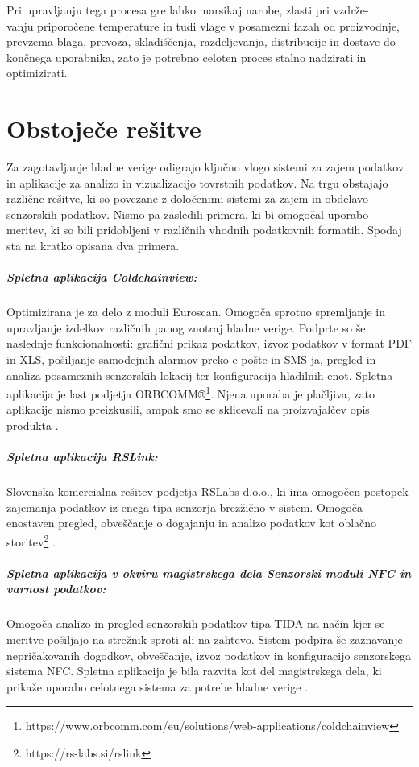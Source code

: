 \documentclass[a4paper, 12pt]{book}
\begin{document}
Pri upravljanju tega procesa gre lahko marsikaj narobe, zlasti pri
vzdrže-\\vanju priporočene temperature in tudi vlage v posamezni fazah od proizvodnje, prevzema blaga, prevoza, skladiščenja, razdeljevanja, distribucije in dostave do končnega uporabnika, zato je potrebno celoten proces stalno nadzirati in optimizirati.


\section{Obstoječe rešitve}

Za zagotavljanje hladne verige odigrajo ključno vlogo sistemi za zajem podatkov in aplikacije za analizo in vizualizacijo tovrstnih podatkov. 
Na trgu obstajajo različne rešitve, ki so povezane z določenimi sistemi za zajem in obdelavo senzorskih podatkov. Nismo pa zasledili primera, ki bi omogočal uporabo meritev, ki so bili pridobljeni v različnih vhodnih podatkovnih formatih. 
Spodaj sta na kratko opisana dva primera.


\subparagraph{\textbf{Spletna aplikacija Coldchainview:}} 
Optimizirana je za delo z moduli Euroscan. Omogoča sprotno spremljanje in upravljanje izdelkov različnih panog znotraj hladne verige. Podprte so še naslednje funkcionalnosti: grafični prikaz podatkov, izvoz podatkov v format PDF in XLS, pošiljanje samodejnih alarmov preko e-pošte in SMS-ja, pregled in analiza posameznih senzorskih lokacij ter konfiguracija hladilnih enot.
Spletna aplikacija je last podjetja ORBCOMM®\footnote
{https://www.orbcomm.com/eu/solutions/web-applications/coldchainview}. Njena uporaba je plačljiva, zato aplikacije nismo preizkusili, ampak smo se sklicevali na proizvajalčev opis produkta \cite{coldchainview}.

\subparagraph{\textbf{Spletna aplikacija RSLink:}}  
Slovenska komercialna rešitev podjetja RSLabs d.o.o., ki ima omogočen postopek zajemanja podatkov iz enega tipa senzorja brezžično v sistem. Omogoča enostaven pregled, obveščanje o dogajanju in analizo podatkov kot oblačno storitev\footnote{https://rs-labs.si/rslink} \cite{rslink}.

\subparagraph{\textbf{Spletna aplikacija v okviru magistrskega dela Senzorski moduli NFC in varnost podatkov:}}  
Omogoča analizo in pregled senzorskih podatkov tipa TIDA na način kjer se meritve pošiljajo na strežnik sproti ali na zahtevo. Sistem podpira še zaznavanje nepričakovanih dogodkov, obveščanje, izvoz podatkov in konfiguracijo senzorskega sistema NFC. Spletna aplikacija je bila razvita kot del magistrskega dela, ki prikaže uporabo celotnega sistema za potrebe hladne verige \cite{magistrska-crnigoj}.
\end{document}
